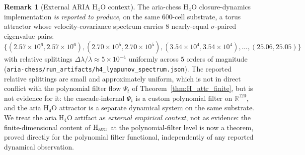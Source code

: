 \documentclass[11pt, a4paper]{amsart}
\theoremstyle{definition}
\newtheorem{remark}[theorem]{Remark}
\newcommand{\R}{\mathbb{R}}
\begin{document}
\begin{remark}[External ARIA H$_4$O context]\label{rmk:aria_attractor}
The aria-chess H$_4$O closure-dynamics implementation
\cite{ariaH4Olaw} \emph{is reported to produce}, on the same
600-cell substrate, a torus attractor whose velocity-covariance
spectrum carries 8 nearly-equal $\sigma$-paired eigenvalue pairs:
\[
\{(2.57{\times}10^6, 2.57{\times}10^6), (2.70{\times}10^5, 2.70{\times}10^5),
(3.54{\times}10^4, 3.54{\times}10^4), \ldots, (25.06, 25.05)\}
\]
with relative splittings $\Delta\lambda / \lambda \approx 5 \times
10^{-4}$ uniformly across $5$ orders of magnitude
(\texttt{aria-chess/run\_artifacts/h4\_lyapunov\_spectrum.json}).
The reported relative splittings are small and approximately
uniform, which is not in direct conflict with the polynomial
filter flow $\Psi_t$ of Theorem~\ref{thm:H_attr_finite}, but is
not evidence for it: the cascade-internal $\Psi_t$ is a custom
polynomial filter on $\R^{120}$, and the aria H$_4$O attractor is
a separate dynamical system on the same substrate.  We treat
the aria H$_4$O artifact as \emph{external empirical context}, not
as evidence: the finite-dimensional content of
$\textup{H}_{\mathrm{attr}}$ at the polynomial-filter level is now
a theorem, proved directly for the polynomial filter functional,
independently of any reported dynamical observation.
\end{remark}
\end{document}
